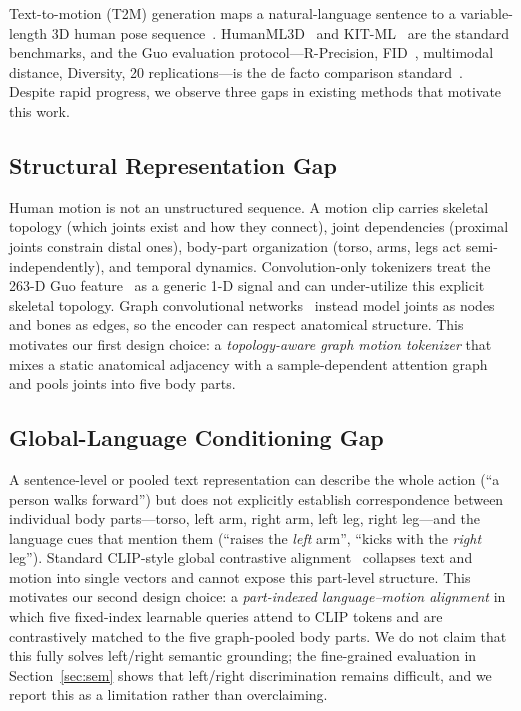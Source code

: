 \documentclass[journal]{IEEEtran}
\begin{document}
Text-to-motion (T2M) generation maps a natural-language sentence to a variable-length 3D human pose sequence~\cite{guo2022humanml3d,tevet2023mdm}. HumanML3D~\cite{guo2022humanml3d} and KIT-ML~\cite{plappert2016kit} are the standard benchmarks, and the Guo evaluation protocol---R-Precision, FID~\cite{heusel2017fid}, multimodal distance, Diversity, 20 replications---is the de facto comparison standard~\cite{guo2022humanml3d,tevet2023mdm}. Despite rapid progress, we observe three gaps in existing methods that motivate this work.

\subsection{Structural Representation Gap}
\label{sec:intro-repr}

Human motion is not an unstructured sequence. A motion clip carries skeletal topology (which joints exist and how they connect), joint dependencies (proximal joints constrain distal ones), body-part organization (torso, arms, legs act semi-independently), and temporal dynamics. Convolution-only tokenizers treat the 263-D Guo feature~\cite{guo2022humanml3d} as a generic 1-D signal and can under-utilize this explicit skeletal topology. Graph convolutional networks~\cite{yan2018stgcn,chen2021ctrgcn} instead model joints as nodes and bones as edges, so the encoder can respect anatomical structure. This motivates our first design choice: a \emph{topology-aware graph motion tokenizer} that mixes a static anatomical adjacency with a sample-dependent attention graph and pools joints into five body parts.

\subsection{Global-Language Conditioning Gap}
\label{sec:intro-align}

A sentence-level or pooled text representation can describe the whole action (``a person walks forward'') but does not explicitly establish correspondence between individual body parts---torso, left arm, right arm, left leg, right leg---and the language cues that mention them (``raises the \emph{left} arm'', ``kicks with the \emph{right} leg''). Standard CLIP-style global contrastive alignment~\cite{radford2021clip} collapses text and motion into single vectors and cannot expose this part-level structure. This motivates our second design choice: a \emph{part-indexed language--motion alignment} in which five fixed-index learnable queries attend to CLIP tokens and are contrastively matched to the five graph-pooled body parts. We do not claim that this fully solves left/right semantic grounding; the fine-grained evaluation in Section~\ref{sec:sem} shows that left/right discrimination remains difficult, and we report this as a limitation rather than overclaiming.
\end{document}
